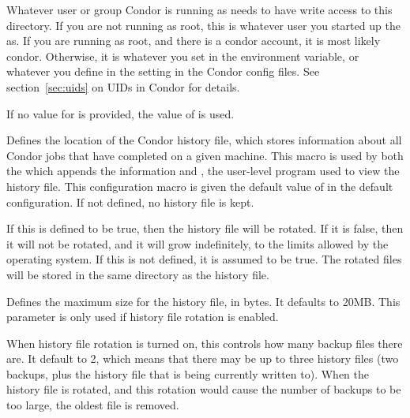 \begin{description}
  Whatever user or group Condor is running as needs to have
  write access to this directory.  If you are not running as root, this
  is whatever user you started up the  as.  If you are
  running as root, and there is a condor account, it is most
  likely condor.
  Otherwise, it is whatever you set in the 
  environment variable, or whatever you define in the
   setting in the Condor config files.
  See section~\ref{sec:uids} on UIDs in Condor for details.

  If no value for  is provided, the value of 
  is used.


\item[\Macro{HISTORY}] \label{param:History} Defines the
  location of the Condor history file, which stores information about
  all Condor jobs that have completed on a given machine.  This macro
  is used by both the  which appends the information
  and , the user-level program used to view
  the history file.
  This configuration macro is given the default value of
   in the default configuration.
  If not defined,
  no history file is kept.

\item[\Macro{ENABLE\_HISTORY\_ROTATION}] \label{param:EnableHistoryRotation} 
  If this is defined to be true, then the
  history file will be rotated. If it is false, then it will not be
  rotated, and it will grow indefinitely, to the limits allowed by the
  operating system. If this is not defined, it is assumed to be
  true. The rotated files will be stored in the same directory as the
  history file. 

\item[\Macro{MAX\_HISTORY\_LOG}] \label{param:MaxHistoryLog}
  Defines the maximum size for the history file, in bytes. It defaults
  to 20MB. This parameter is only used if history file rotation is
  enabled. 

\item[\Macro{MAX\_HISTORY\_ROTATIONS}] \label{param:MaxHistoryRotations}
  When history file rotation is turned on, this controls how many
  backup files there are. It default to 2, which means that there may
  be up to three history files (two backups, plus the history file
  that is being currently written to). When the history file is
  rotated, and this rotation would cause the number of backups to be
  too large, the oldest file is removed. 


\end{description}

